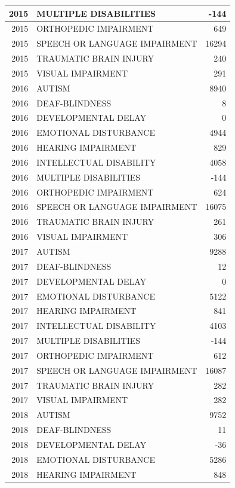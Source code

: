 \documentclass[
  english,
  man]{apa6}
\begin{document}
\begin{tabular}{r|l|r}
\hline
2015 & MULTIPLE DISABILITIES & -144\\
\hline
2015 & ORTHOPEDIC IMPAIRMENT & 649\\
\hline
2015 & SPEECH OR LANGUAGE IMPAIRMENT & 16294\\
\hline
2015 & TRAUMATIC BRAIN INJURY & 240\\
\hline
2015 & VISUAL IMPAIRMENT & 291\\
\hline
2016 & AUTISM & 8940\\
\hline
2016 & DEAF-BLINDNESS & 8\\
\hline
2016 & DEVELOPMENTAL DELAY & 0\\
\hline
2016 & EMOTIONAL DISTURBANCE & 4944\\
\hline
2016 & HEARING IMPAIRMENT & 829\\
\hline
2016 & INTELLECTUAL DISABILITY & 4058\\
\hline
2016 & MULTIPLE DISABILITIES & -144\\
\hline
2016 & ORTHOPEDIC IMPAIRMENT & 624\\
\hline
2016 & SPEECH OR LANGUAGE IMPAIRMENT & 16075\\
\hline
2016 & TRAUMATIC BRAIN INJURY & 261\\
\hline
2016 & VISUAL IMPAIRMENT & 306\\
\hline
2017 & AUTISM & 9288\\
\hline
2017 & DEAF-BLINDNESS & 12\\
\hline
2017 & DEVELOPMENTAL DELAY & 0\\
\hline
2017 & EMOTIONAL DISTURBANCE & 5122\\
\hline
2017 & HEARING IMPAIRMENT & 841\\
\hline
2017 & INTELLECTUAL DISABILITY & 4103\\
\hline
2017 & MULTIPLE DISABILITIES & -144\\
\hline
2017 & ORTHOPEDIC IMPAIRMENT & 612\\
\hline
2017 & SPEECH OR LANGUAGE IMPAIRMENT & 16087\\
\hline
2017 & TRAUMATIC BRAIN INJURY & 282\\
\hline
2017 & VISUAL IMPAIRMENT & 282\\
\hline
2018 & AUTISM & 9752\\
\hline
2018 & DEAF-BLINDNESS & 11\\
\hline
2018 & DEVELOPMENTAL DELAY & -36\\
\hline
2018 & EMOTIONAL DISTURBANCE & 5286\\
\hline
2018 & HEARING IMPAIRMENT & 848\\

\end{tabular}
\end{document}
